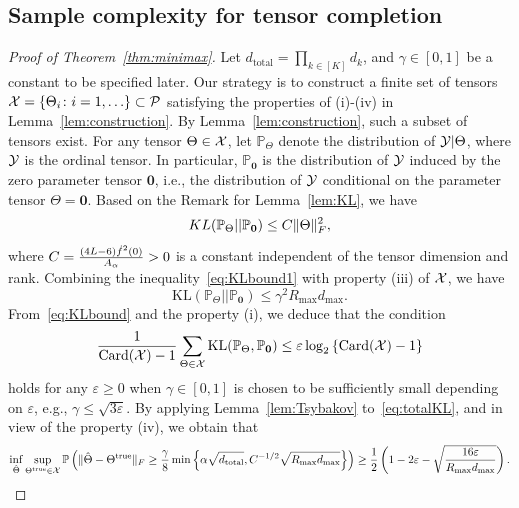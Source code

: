 \documentclass[11pt]{article}
\theoremstyle{plain}
\theoremstyle{definition}
\begin{document}
\subsection{Sample complexity for tensor completion}
\begin{proof}[Proof of Theorem~\ref{thm:minimax}]

Let $d_{\text{total}}=\prod_{k\in[K]}d_k$, and $\gamma\in[0,1]$ be a constant to be specified later.  Our strategy is to construct a finite set of tensors $\mathcal{X}=\{\Theta_i\colon i=1,\ldots \}\subset \mathcal{P}$ satisfying the properties of (i)-(iv) in Lemma~\ref{lem:construction}. By Lemma~\ref{lem:construction}, such a subset of tensors exist. For any tensor  $\Theta\in\mathcal{X}$, let $\mathbb{P}_{\Theta}$ denote the distribution of $\mathcal{Y}|\Theta$, where $\mathcal{Y}$ is the ordinal tensor. In particular, $\mathbb{P}_{\mathbf{0}}$ is the distribution of $\mathcal{Y}$ induced by the zero parameter tensor $\mathbf{0}$, i.e., the distribution of $\mathcal{Y}$ conditional on the parameter tensor $\Theta=\mathbf{0}$. Based on the Remark for Lemma~\ref{lem:KL}, we have
\begin{equation}\label{eq:KLbound1}
KL(\mathbb{P}_{\Theta}|| \mathbb{P}_{\mathbf{0}})\leq C \lVert\Theta\rVert_F^2,
\end{equation}
where $C={(4L-6) \dot{f}^2(0)\over  A_\alpha}>0$ is a constant independent of the tensor dimension and rank.
Combining the inequality~\eqref{eq:KLbound1} with property (iii) of $\mathcal{X}$, we have
\begin{equation}\label{eq:KLbound}
\text{KL}(\mathbb{P}_{\Theta}||\mathbb{P}_{\mathbf{0}})\leq \gamma^2 R_{\max} d_{\max}.
\end{equation}
From~\eqref{eq:KLbound} and the property (i), we deduce that the condition
\begin{equation}\label{eq:totalKL}
{1\over \text{Card}(\mathcal{X})-1}\sum_{\Theta \in\mathcal{X}}\text{KL}(\mathbb{P}_{\Theta}, \mathbb{P}_{\mathbf{0}})\leq \varepsilon \log_2\left\{\text{Card}(\mathcal{X})-1 \right\}
\end{equation}
holds for any $ \varepsilon \geq 0$ when $\gamma\in[0,1]$ is chosen to be sufficiently small depending on $\varepsilon$, e.g., $\gamma \leq \sqrt{3\varepsilon}$. By applying Lemma~\ref{lem:Tsybakov} to~\eqref{eq:totalKL}, and in view of the property (iv), we obtain that
\begin{equation}\label{eq:final}
\inf_{\hat \Theta}\sup_{\trueT\in \tX}\mathbb{P}\left(\FnormSize{}{\hat \Theta- \trueT}\geq  {\gamma\over 8} \min\left\{ \alpha\sqrt{d_{\text{total}}}, C^{-1/2}\sqrt{ R_{\max}d_{\max}}\right\} \right)\geq {1\over 2}\left(1-2\varepsilon-\sqrt{16 \varepsilon \over R_{\max}d_{\max}}\right).

\end{equation}
\end{proof}
\end{document}
